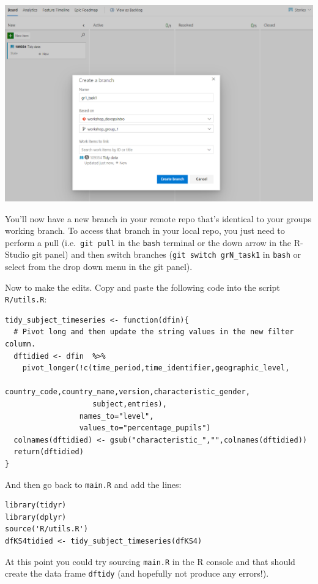 \documentclass[
  12pt,
]{article}
\begin{document}
\begin{center}\includegraphics[width=0.8\linewidth]{images/DevOpsdemo/DevOps_Boards_newbranch} \end{center}

You'll now have a new branch in your remote repo that's identical to
your groups working branch. To access that branch in your local repo,
you just need to perform a pull (i.e.~\texttt{git\ pull} in the
\texttt{bash} terminal or the down arrow in the R-Studio git panel) and
then switch branches (\texttt{git\ switch\ grN\_task1} in \texttt{bash}
or select from the drop down menu in the git panel).

Now to make the edits. Copy and paste the following code into the script
\texttt{R/utils.R}:

\begin{verbatim}
tidy_subject_timeseries <- function(dfin){
  # Pivot long and then update the string values in the new filter column.
  dftidied <- dfin  %>%
    pivot_longer(!c(time_period,time_identifier,geographic_level,
                    country_code,country_name,version,characteristic_gender,
                    subject,entries),
                 names_to="level",
                 values_to="percentage_pupils")
  colnames(dftidied) <- gsub("characteristic_","",colnames(dftidied))
  return(dftidied)
}
\end{verbatim}

And then go back to \texttt{main.R} and add the lines:

\begin{verbatim}
library(tidyr)
library(dplyr)
source('R/utils.R')
dfKS4tidied <- tidy_subject_timeseries(dfKS4)
\end{verbatim}

At this point you could try sourcing \texttt{main.R} in the R console
and that should create the data frame \texttt{dftidy} (and hopefully not
produce any errors!).
\end{document}
